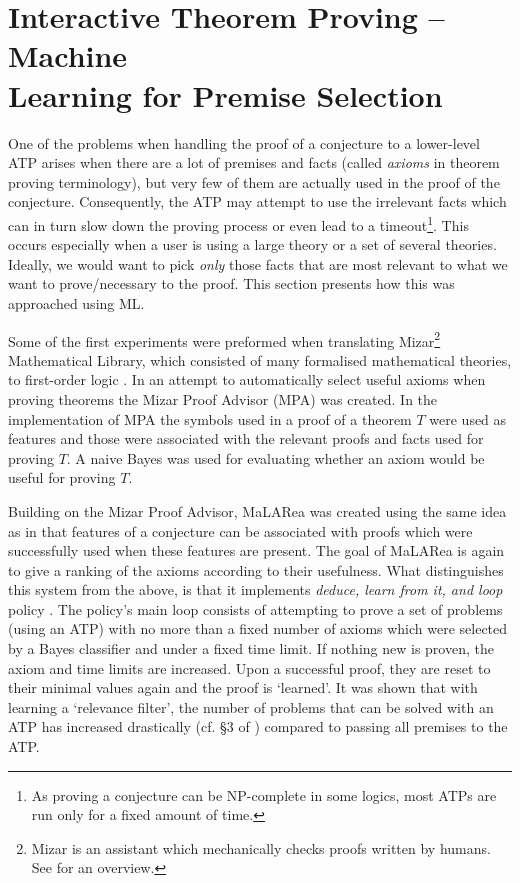 \documentclass{article}
\begin{document}
\section{Interactive Theorem Proving -- Machine \\ Learning for Premise Selection}\label{sec:ITP}

One of the problems when handling the proof of a conjecture to a lower-level
ATP arises when there are a lot of premises and facts (called \emph{axioms} in
theorem proving terminology), but very few of them are actually used in the
proof of the conjecture. Consequently, the ATP may attempt to use the
irrelevant facts which can in turn slow down the proving process or even lead
to a timeout\footnote{As proving a conjecture can be NP-complete in some
logics, most ATPs are run only for a fixed amount of time.}. This occurs
especially when a user is using a large theory or a set of several theories.
Ideally, we would want to pick \emph{only} those facts that are most relevant
to what we want to prove/necessary to the proof. This section presents how this
was approached using ML.

Some of the first experiments were preformed when translating
Mizar\footnote{Mizar is an assistant which mechanically checks proofs written
by humans. See \cite{MizarOverview} for an overview.} Mathematical Library,
which consisted of many formalised mathematical theories, to first-order logic
\citep{MizarProofAdvisor}. In an attempt to automatically select useful axioms
when proving theorems the Mizar Proof Advisor (MPA) was created. In the
implementation of MPA the symbols used in a proof of a theorem $T$ were used as
features and those were associated with the relevant proofs and facts used for
proving $T$. A naive Bayes was used for evaluating whether an axiom would be
useful for proving $T$. 

Building on the Mizar Proof Advisor, MaLARea \citep{MaLARea} was created using
the same idea as in \cite{MizarProofAdvisor} that features of a conjecture can
be associated with proofs which were successfully used when these features are
present. The goal of MaLARea is again to give a ranking of the axioms according
to their usefulness. What distinguishes this system from the above, is that it
implements \emph{deduce, learn from it, and loop} policy \citep[p.~3]{MaLARea}.
The policy's main loop consists of attempting to prove a set of problems (using
an ATP) with no more than a fixed number of axioms which were selected by
a Bayes classifier and under a fixed time limit. If nothing new is proven, the
axiom and time limits are increased. Upon a successful proof, they are reset to
their minimal values again and the proof is `learned'. It was shown that with
learning a `relevance filter', the number of problems that can be solved with
an ATP has increased drastically (cf. \S 3 of \cite{MaLARea}) compared to
passing all premises to the ATP.
\end{document}
